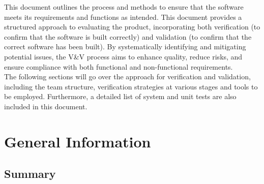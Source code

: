 \documentclass[12pt, titlepage]{article}
\begin{document}
\tableofcontents

\listoftables
{}


\newpage







This document outlines the process and methods to ensure that the
software meets its requirements and functions as intended. This
document provides a structured approach to evaluating the product,
incorporating both verification (to confirm that the software is
built correctly) and validation (to confirm that the correct software
has been built). By systematically identifying and mitigating
potential issues, the V\&V process aims to enhance quality, reduce
risks, and ensure compliance with both functional and non-functional
requirements.\\

The following sections will go over the approach for verification and
validation, including the team structure, verification strategies at
various stages and tools to be employed. Furthermore, a detailed list
of system and unit tests are also included in this document.

\section{General Information}

\subsection{Summary}
\end{document}
